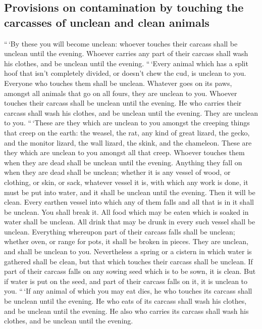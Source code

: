 \hypertarget{provisions-on-contamination-by-touching-the-carcasses-of-unclean-and-clean-animals}{%
\subsection{Provisions on contamination by touching the carcasses of
unclean and clean
animals}\label{provisions-on-contamination-by-touching-the-carcasses-of-unclean-and-clean-animals}}

 ``\,`By these you will become unclean: whoever touches
their carcass shall be unclean until the evening. 
Whoever carries any part of their carcass shall wash his clothes, and be
unclean until the evening.  ``\,`Every animal which has a
split hoof that isn't completely divided, or doesn't chew the cud, is
unclean to you. Everyone who touches them shall be unclean.
 Whatever goes on its paws, amongst all animals that go
on all fours, they are unclean to you. Whoever touches their carcass
shall be unclean until the evening.  He who carries their
carcass shall wash his clothes, and be unclean until the evening. They
are unclean to you.  ``\,`These are they which are
unclean to you amongst the creeping things that creep on the earth: the
weasel, the rat, any kind of great lizard,  the gecko,
and the monitor lizard, the wall lizard, the skink, and the chameleon.
 These are they which are unclean to you amongst all that
creep. Whoever touches them when they are dead shall be unclean until
the evening.  Anything they fall on when they are dead
shall be unclean; whether it is any vessel of wood, or clothing, or
skin, or sack, whatever vessel it is, with which any work is done, it
must be put into water, and it shall be unclean until the evening. Then
it will be clean.  Every earthen vessel into which any of
them falls and all that is in it shall be unclean. You shall break it.
 All food which may be eaten which is soaked in water
shall be unclean. All drink that may be drunk in every such vessel shall
be unclean.  Everything whereupon part of their carcass
falls shall be unclean; whether oven, or range for pots, it shall be
broken in pieces. They are unclean, and shall be unclean to you.
 Nevertheless a spring or a cistern in which water is
gathered shall be clean, but that which touches their carcass shall be
unclean.  If part of their carcass falls on any sowing
seed which is to be sown, it is clean.  But if water is
put on the seed, and part of their carcass falls on it, it is unclean to
you.  ``\,`If any animal of which you may eat dies, he
who touches its carcass shall be unclean until the evening.
 He who eats of its carcass shall wash his clothes, and
be unclean until the evening. He also who carries its carcass shall wash
his clothes, and be unclean until the evening.

